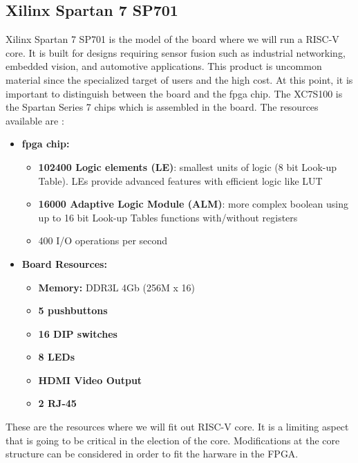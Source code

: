 \subsection{Xilinx Spartan 7 SP701} \label{sec:fpga}
Xilinx Spartan 7 SP701 is the model of the board where we will run a RISC-V core. It is built for designs requiring sensor fusion such as industrial networking, embedded vision, and automotive applications. This product is uncommon material since the specialized target of users and the high cost. At this point, it is important to distinguish between the board and the \gls{fpga} chip. The XC7S100 is the Spartan Series 7 chips which is assembled in the board. The resources available are \cite{xilinxsp}:  

\begin{itemize}
	\item \textbf{\gls{fpga} chip:}
	\begin{itemize}
		\item \textbf{102400 Logic elements (LE)}: smallest units of logic (8 bit Look-up Table). LEs  provide advanced features with efficient logic like LUT
	   	\item \textbf{16000 Adaptive Logic Module (ALM)}: more complex boolean using up to 16 bit Look-up Tables functions with/without registers
	    	\item 400 I/O operations per second %
	\end{itemize}
	\item \textbf{Board  Resources:}
	\begin{itemize}
		\item \textbf{Memory:} DDR3L 4Gb (256M x 16)
		\item \textbf{5 pushbuttons}
		\item \textbf{16 DIP switches}
		\item \textbf{8 LEDs}
		\item \textbf{HDMI Video Output}
		\item \textbf{2 RJ-45}
		
	\end{itemize}
\end{itemize}

These are the resources where we will fit out RISC-V core. It is a limiting aspect that is going to be critical in the election of the core. Modifications at the core structure can be considered in order to fit the harware in the FPGA. 




